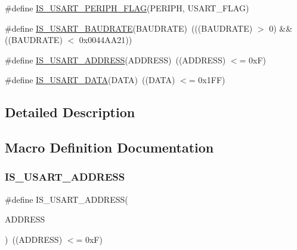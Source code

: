 \begin{DoxyCompactItemize}
\item 
\#define \hyperlink{group___u_s_a_r_t___flags_gad8395894e77b07a0713756b355aa22e5}{I\+S\+\_\+\+U\+S\+A\+R\+T\+\_\+\+P\+E\+R\+I\+P\+H\+\_\+\+F\+L\+AG}(P\+E\+R\+I\+PH,  U\+S\+A\+R\+T\+\_\+\+F\+L\+AG)
\item 
\#define \hyperlink{group___u_s_a_r_t___flags_ga9dc365e0a1e01031a8e0757a34b9d420}{I\+S\+\_\+\+U\+S\+A\+R\+T\+\_\+\+B\+A\+U\+D\+R\+A\+TE}(B\+A\+U\+D\+R\+A\+TE)~(((B\+A\+U\+D\+R\+A\+TE) $>$ 0) \&\& ((B\+A\+U\+D\+R\+A\+TE) $<$ 0x0044\+A\+A21))
\item 
\#define \hyperlink{group___u_s_a_r_t___flags_ga194e771c3324f9e130b2887c701460a7}{I\+S\+\_\+\+U\+S\+A\+R\+T\+\_\+\+A\+D\+D\+R\+E\+SS}(A\+D\+D\+R\+E\+SS)~((A\+D\+D\+R\+E\+SS) $<$= 0x\+F)
\item 
\#define \hyperlink{group___u_s_a_r_t___flags_gafd6307e41818e076d31f3c24cb5ba135}{I\+S\+\_\+\+U\+S\+A\+R\+T\+\_\+\+D\+A\+TA}(D\+A\+TA)~((D\+A\+TA) $<$= 0x1\+F\+F)
\end{DoxyCompactItemize}


\subsection{Detailed Description}


\subsection{Macro Definition Documentation}
\mbox{\label{group___u_s_a_r_t___flags_ga194e771c3324f9e130b2887c701460a7}} 
\subsubsection{\texorpdfstring{I\+S\+\_\+\+U\+S\+A\+R\+T\+\_\+\+A\+D\+D\+R\+E\+SS}{IS\_USART\_ADDRESS}}
{\footnotesize\ttfamily \#define I\+S\+\_\+\+U\+S\+A\+R\+T\+\_\+\+A\+D\+D\+R\+E\+SS(\begin{DoxyParamCaption}\item[{}]{A\+D\+D\+R\+E\+SS }\end{DoxyParamCaption})~((A\+D\+D\+R\+E\+SS) $<$= 0x\+F)}



